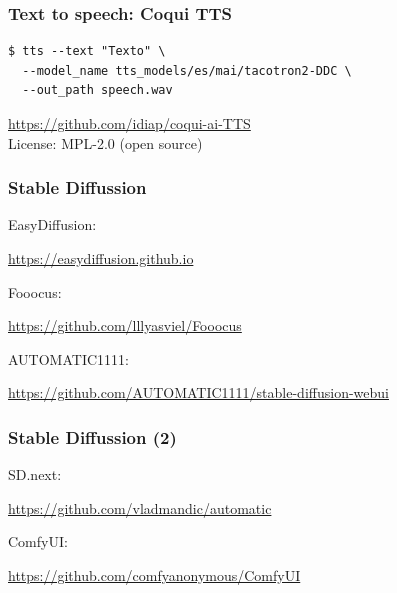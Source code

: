 \documentclass[17pt,aspectratio=169,hyperref={pdfusetitle,colorlinks,allcolors=olive}]{beamer}
\begin{document}
\begin{frame}[fragile]
  \frametitle{Text to speech: Coqui TTS}

{\small
\begin{verbatim}
$ tts --text "Texto" \
  --model_name tts_models/es/mai/tacotron2-DDC \
  --out_path speech.wav
\end{verbatim}
}

  \begin{flushright}
    {\small
    \url{https://github.com/idiap/coqui-ai-TTS} \\
    License: MPL-2.0 (open source) \\
  }
  \end{flushright}

\end{frame}


\begin{frame}[fragile]
\frametitle{Stable Diffussion}

EasyDiffusion:
\begin{flushright}
\url{https://easydiffusion.github.io}
\end{flushright}

Fooocus:
\begin{flushright}
\url{https://github.com/lllyasviel/Fooocus}
\end{flushright}

AUTOMATIC1111:
\begin{flushright}
\url{https://github.com/AUTOMATIC1111/stable-diffusion-webui}
\end{flushright}

\end{frame}

\begin{frame}[fragile]
\frametitle{Stable Diffussion (2)}

SD.next:
\begin{flushright}
\url{https://github.com/vladmandic/automatic}
\end{flushright}

ComfyUI:
\begin{flushright}
\url{https://github.com/comfyanonymous/ComfyUI}
\end{flushright}

\end{frame}
\end{document}
